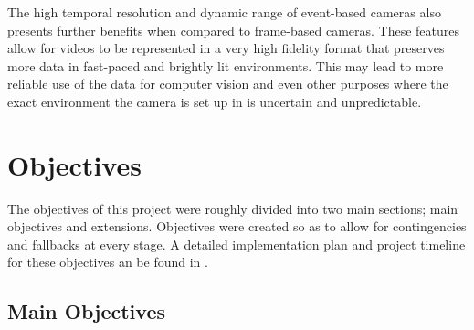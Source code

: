 The high temporal resolution and dynamic range of event-based cameras also presents further benefits when compared to frame-based cameras. These features allow for videos to be represented in a very high fidelity format that preserves more data in fast-paced and brightly lit environments. This may lead to more reliable use of the data for computer vision and even other purposes where the exact environment the camera is set up in is uncertain and unpredictable.

\section{Objectives}

The objectives of this project were roughly divided into two main sections; main objectives and extensions. Objectives were created so as to allow for contingencies and fallbacks at every stage. A detailed implementation plan and project timeline for these objectives an be found in .

\subsection{Main Objectives}


